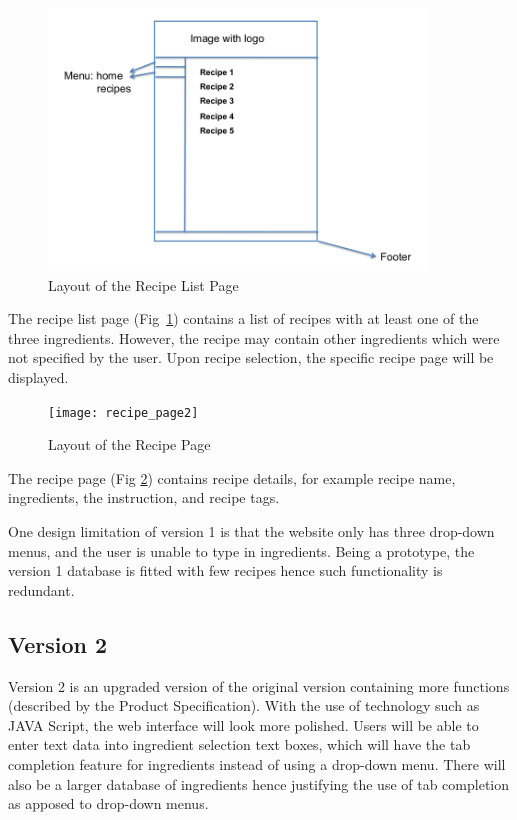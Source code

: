 \begin{figure}[H] %
\includegraphics[width=0.9\textwidth]{recipe_list_page}
\caption{Layout of the Recipe List Page}
\label{fig:recipe_list}
\end{figure}

The recipe list page (Fig~\ref{fig:recipe_list}) contains a list of recipes with at least one of the three ingredients. However, the recipe may contain other ingredients which were not specified by the user. Upon recipe selection, the specific recipe page will be displayed.

\begin{figure}[H]
\texttt{[image: recipe\_page2]}
\caption{Layout of the Recipe Page}
\label{fig:recipe_page}
\end{figure}

The recipe page (Fig \ref{fig:recipe_page}) contains recipe details, for example recipe name, ingredients, the instruction, and recipe tags.
 
One design limitation of version 1 is that the website only has three drop-down menus, and the user is unable to type in ingredients. Being a prototype, the version 1 database is fitted with few recipes hence such functionality is redundant. 

\subsection{Version 2}
Version 2 is an upgraded version of the original version containing more functions (described by the Product Specification). With the use of technology such as JAVA Script, the web interface will look more polished. Users will be able to enter text data into ingredient selection text boxes, which will have the tab completion feature for ingredients instead of using a drop-down menu. There will also be a larger database of ingredients hence justifying the use of tab completion as apposed to drop-down menus.

